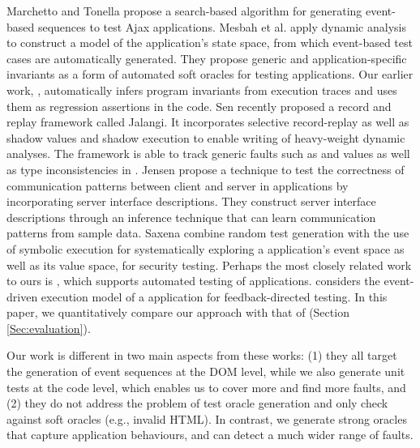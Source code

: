 Marchetto and Tonella \cite{marchetto:search} propose a search-based algorithm for generating event-based sequences to test Ajax applications. 
Mesbah et al.  \cite{mesbah:tweb11} apply dynamic analysis to construct a model of the application's state space, from which event-based test cases are automatically generated. They propose \cite{mesbah:tse12} generic and application-specific invariants as a form of automated soft oracles for testing \ajax applications.  Our earlier work, \jsart \cite{mirshokraie:icwe12},  automatically infers program invariants from \javascript execution traces and uses them as regression assertions in the code. 
Sen \etal \cite{sen:fse13} recently proposed a record and replay framework called Jalangi. It incorporates selective record-replay as well as shadow values and shadow execution to enable writing of heavy-weight dynamic analyses.
The framework is able to track generic faults such as  and  values as well as type inconsistencies in \javascript. 
Jensen \etal \cite{jensen:fse13} propose a technique to test the correctness of communication patterns between client and server in \ajax applications by incorporating server interface descriptions.
They construct server interface descriptions through an inference technique that can learn communication patterns from sample data.
Saxena \etal \cite{song:symb10} combine random test generation with the use of symbolic execution for systematically exploring a \javascript application's event space as well as its value space, for security testing.  Perhaps the most closely related work to ours is \artemis \cite{artzi:icse11}, which supports automated testing of \javascript applications.
\artemis considers the event-driven execution model of a \javascript application for feedback-directed testing.
In this paper, we quantitatively compare our approach with that of \artemis (Section \ref{Sec:evaluation}). 

Our work is different in two main aspects from these works: (1) they all target the generation of event sequences at the DOM level, while we also generate unit tests at the \javascript code level, which enables us to cover more and find more faults,
and (2) they do not address the problem of test oracle generation and only check against soft oracles (e.g., invalid HTML). In contrast, we generate strong oracles that capture
application behaviours, and can detect a much wider range of faults.

